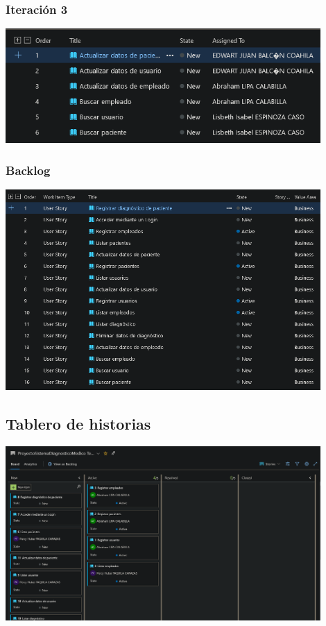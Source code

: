 \documentclass[preprint,12pt]{elsarticle}
\begin{document}
	\subsubsection{Iteración 3}
	\begin{center}
	\includegraphics[width=12cm]{./imagen/Screenshot_5.png}
	\end{center}

	\subsubsection{Backlog}
	\begin{center}
	\includegraphics[width=12cm]{./imagen/Screenshot_8.png}
	\end{center}

	\subsection{Tablero de historias}


	\includegraphics[width=12cm]{./imagen/Screenshot_2020-10-31 ProyectoSistemaDiagnosticoMedico Team Stories Board - Boards.png}
\end{document}
